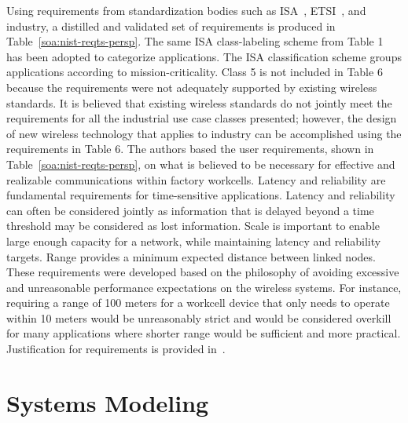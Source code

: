 Using requirements from standardization bodies such as ISA~\cite{ISATR100-2011}, ETSI~\cite{etsi103588}, and industry, a distilled and validated set of requirements is produced in Table~\ref{soa:nist-reqts-persp}. The same ISA class-labeling scheme from Table 1 has been adopted to categorize applications. The ISA classification scheme groups applications according to mission-criticality. Class 5 is not included in Table 6 because the requirements were not adequately supported by existing wireless standards. It is believed that existing wireless standards do not jointly meet the requirements for all the industrial use case classes presented; however, the design of new wireless technology that applies to industry can be accomplished using the requirements in Table 6. The authors based the user requirements, shown in Table~\ref{soa:nist-reqts-persp}, on what is believed to be necessary for effective and realizable communications within factory workcells. Latency and reliability are fundamental requirements for time-sensitive applications. Latency and reliability can often be considered jointly as information that is delayed beyond a time threshold may be considered as lost information. Scale is important to enable large enough capacity for a network, while maintaining latency and reliability targets. Range provides a minimum expected distance between linked nodes. These requirements were developed based on the philosophy of avoiding excessive and unreasonable performance expectations on the wireless systems. For instance, requiring a range of 100 meters for a workcell device that only needs to operate within 10 meters would be unreasonably strict and would be considered overkill for many applications where shorter range would be sufficient and more practical. Justification for requirements is provided in~\cite{Montgomery2019}.



\section{Systems Modeling}\label{chapter:soa:modeling}

